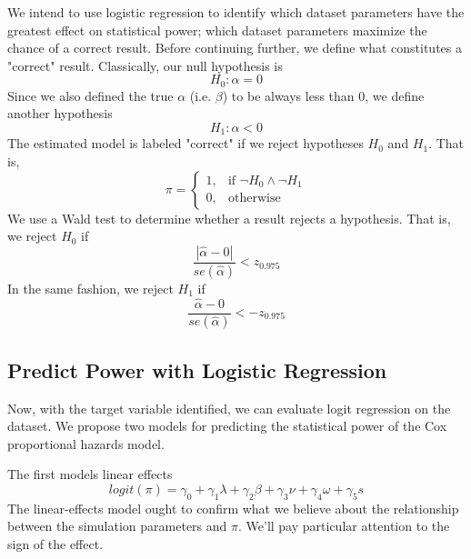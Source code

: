We intend to use logistic regression to identify which dataset parameters have the greatest effect on statistical power; which dataset parameters maximize the chance of a correct result. Before continuing further, we define what constitutes a "correct" result. Classically, our null hypothesis is
%
\begin{equation}
    H_0 : \alpha = 0 
\end{equation}
%
Since we also defined the true $\alpha$ (i.e. $\beta$) to be always less than 0, we define another hypothesis
%
\begin{equation}
    H_1 : \alpha < 0 
\end{equation}
%
The estimated model is labeled "correct" if we reject hypotheses $H_0$ and $H_1$. That is,
%
\begin{equation}
  \pi =
  \begin{cases}
    1, & \text{if } \neg H_0 \land \neg H_1 \\
    0, & \text{otherwise}
  \end{cases}
\end{equation}
%
We use a Wald test \cite{wald} to determine whether a result rejects a hypothesis. That is, we reject $H_0$ if 
%
\begin{equation}
 \frac{| \hat \alpha - 0 |}{se(\hat \alpha)} < z_{0.975}
\end{equation}
%
In the same fashion, we reject $H_1$ if\footnotemark
%
\begin{equation}
 \frac{ \hat \alpha - 0 }{se(\hat \alpha)} < -z_{0.975}
\end{equation}
%
\subsection{Predict Power with Logistic Regression}

Now, with the target variable identified, we can evaluate logit regression on the dataset. We propose two models for predicting the statistical power of the Cox proportional hazards model. 

The first models linear effects
%
\begin{equation}
    logit(\pi)  = \gamma_{0} + 
        \gamma_{1} \lambda + 
        \gamma_{2} \beta + 
        \gamma_{3} \nu +
        \gamma_{4} \omega +
        \gamma_{5} s
\end{equation}
%
The linear-effects model ought to confirm what we believe about the relationship between the simulation parameters and $\pi$. We'll pay particular attention to the sign of the effect. 

